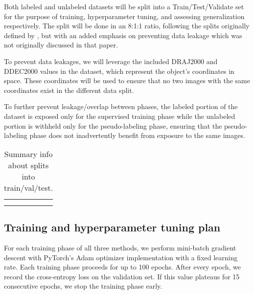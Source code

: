 \documentclass{article}
\begin{document}
Both labeled and unlabeled datasets will be split into a Train/Test/Validate set for the purpose of training, hyperparameter tuning, and assessing generalization respectively. The split will be done in an 8:1:1 ratio, following the splits originally defined by \cite{awangiskandar2020}, but with an added emphasis on preventing data leakage which was not originally discussed in that paper.

To prevent data leakages, we will leverage the included DRAJ2000 and DDEC2000 values in the dataset, which represent the object's coordinates in space. These coordinates will be used to ensure that no two images with the same coordinates exist in the different data split. 

To further prevent leakage/overlap between phases, the labeled portion of the dataset is exposed only for the supervised training phase while the unlabeled portion is withheld only for the pseudo-labeling phase, ensuring that the pseudo-labeling phase does not inadvertently benefit from exposure to the same images.


\begin{table}[!h]
    \centering
    \begin{tabular}{c|c}
         &  \\
         & 
    \end{tabular}
    \caption{Summary info about splits into train/val/test.}
    \label{tab:my_label}
\end{table}

\subsection{Training and hyperparameter tuning plan}

For each training phase of all three methods, we perform mini-batch gradient descent with PyTorch's Adam optimizer implementation \cite{paszke2019pytorch} with a fixed learning rate. Each training phase proceeds for up to 100 epochs. After every epoch, we record the cross-entropy loss on the validation set. If this value plateaus for 15 consecutive epochs, we stop the training phase early.
\end{document}
